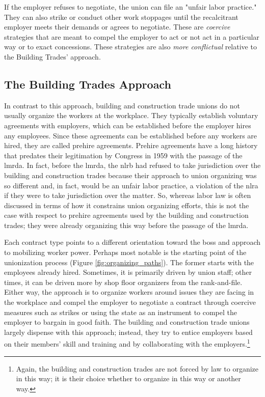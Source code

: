 \documentclass[12pt]{article}
\begin{document}
If the employer refuses to negotiate, the union can file an "unfair labor practice." They can also strike or conduct other work stoppages until the recalcitrant employer meets their demands or agrees to negotiate. These are \textit{coercive} strategies that are meant to compel the employer to act or not act in a particular way or to exact concessions. These strategies are also \textit{more conflictual} relative to the Building Trades' approach.

\subsection{The Building Trades Approach}

In contrast to this approach, building and construction trade unions do not usually organize the workers at the workplace. They typically establish voluntary agreements with employers, which can be established before the employer hires any employees. Since these agreements can be established before any workers are hired, they are called prehire agreements. Prehire agreements have a long history that predates their legitimation by Congress in 1959 with the passage of the \acrfull{lmrda}. In fact, before the \acrshort{lmrda}, the \acrshort{nlrb} had refused to take jurisdiction over the building and construction trades because their approach to union organizing was so different and, in fact, would be an unfair labor practice, a violation of the \acrshort{nlra} if they were to take jurisdiction over the matter. So, whereas labor law is often discussed in terms of how it constrains union organizing efforts, this is not the case with respect to prehire agreements used by the building and construction trades; they were already organizing this way before the passage of the \acrshort{lmrda}.

Each contract type points to a different orientation toward the boss and approach to mobilizing worker power. Perhaps most notable is the starting point of the unionization process (Figure \ref{fig:organizing_paths}). The former starts with the employees already hired. Sometimes, it is primarily driven by union staff; other times, it can be driven more by shop floor organizers from the rank-and-file. Either way, the approach is to organize workers around issues they are facing in the workplace and compel the employer to negotiate a contract through coercive measures such as strikes or using the state as an instrument to compel the employer to bargain in good faith. The building and construction trade unions largely dispense with this approach; instead, they try to entice employers based on their members’ skill and training and by collaborating with the employers.\footnote{Again, the building and construction trades are not forced by law to organize in this way; it is their choice whether to organize in this way or another way.}
\end{document}
